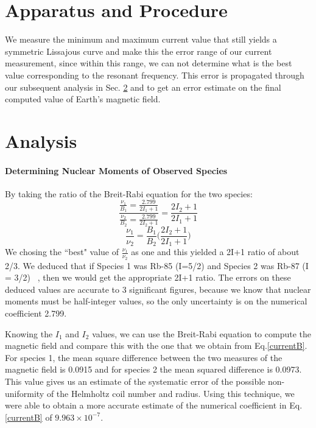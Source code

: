 \documentclass{sigchi}
\begin{document}
\section{Apparatus and Procedure}\label{sec:ap}
We measure the minimum and maximum current value that still yields a symmetric Lissajous curve and make this the error range of our current measurement, since within this range, we can not determine what is the best value corresponding to the resonant frequency. This error is propagated through our subsequent analysis in Sec. \ref{sec:analysis} and to get an error estimate on the final computed value of Earth's magnetic field.
\section{Analysis}\label{sec:analysis}
\paragraph{Determining Nuclear Moments of Observed Species}
\par By taking the ratio of the Breit-Rabi equation for the two species: 
\begin{equation*}
\frac{\frac{\nu_1}{B_1} = \frac{2.799}{2I_1+1}}{\frac{\nu_2}{B_2} = \frac{2.799}{2I_2+1}} = \frac{2I_2+1}{2I_1+1}
\end{equation*}
\begin{equation*}
\frac{\nu_1}{\nu_2} = \frac{B_1}{B_2}\Bigg(\frac{2I_2+1}{2I_1+1}\Bigg)
\end{equation*}
We chosing the ``best" value of $\frac{\nu_1}{\nu_2} $ as one and this yielded a 2I+1 ratio of about 2/3. We deduced that if Species 1 was Rb-85 (I=5/2) and Species 2 was Rb-87 (I = 3/2) ~\cite{PhysRev}, then we would get the appropriate 2I+1 ratio. The errors on these deduced values are accurate to 3 significant figures, because we know that nuclear moments must be half-integer values, so the only uncertainty is on the numerical coefficient 2.799. 
\par Knowing the $I_1$ and $I_2$ values, we can use the Breit-Rabi equation to compute the magnetic field and compare this with the one that we obtain from Eq.\ref{currentB}. For species 1, the mean square difference between the two measures of the magnetic field is 0.0915 and for species 2 the mean squared difference is 0.0973. This value gives us an estimate of the systematic error of the possible non-uniformity of the Helmholtz coil number and radius.  Using this technique, we were able to obtain a more accurate estimate of the numerical coefficient in Eq.\ref{currentB} of  $9.963\times 10^{-7}$. 
\end{document}
